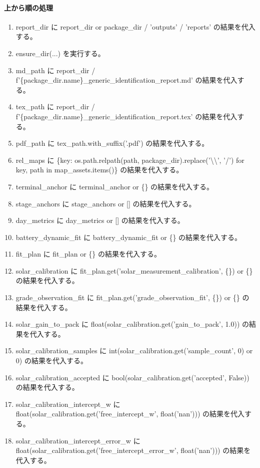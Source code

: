 \documentclass[a4paper,11pt]{article}
\begin{document}
            \paragraph{上から順の処理}
            \begin{enumerate}[leftmargin=1.8em]
            \item report\_dir に report\_dir or package\_dir / 'outputs' / 'reports' の結果を代入する。
\item ensure\_dir(...) を実行する。
\item md\_path に report\_dir / f'\{package\_dir.name\}\_generic\_identification\_report.md' の結果を代入する。
\item tex\_path に report\_dir / f'\{package\_dir.name\}\_generic\_identification\_report.tex' の結果を代入する。
\item pdf\_path に tex\_path.with\_suffix('.pdf') の結果を代入する。
\item rel\_maps に \{key: os.path.relpath(path, package\_dir).replace('\textbackslash{}\textbackslash{}', '/') for key, path in map\_assets.items()\} の結果を代入する。
\item terminal\_anchor に terminal\_anchor or \{\} の結果を代入する。
\item stage\_anchors に stage\_anchors or [] の結果を代入する。
\item day\_metrics に day\_metrics or [] の結果を代入する。
\item battery\_dynamic\_fit に battery\_dynamic\_fit or \{\} の結果を代入する。
\item fit\_plan に fit\_plan or \{\} の結果を代入する。
\item solar\_calibration に fit\_plan.get('solar\_measurement\_calibration', \{\}) or \{\} の結果を代入する。
\item grade\_observation\_fit に fit\_plan.get('grade\_observation\_fit', \{\}) or \{\} の結果を代入する。
\item solar\_gain\_to\_pack に float(solar\_calibration.get('gain\_to\_pack', 1.0)) の結果を代入する。
\item solar\_calibration\_samples に int(solar\_calibration.get('sample\_count', 0) or 0) の結果を代入する。
\item solar\_calibration\_accepted に bool(solar\_calibration.get('accepted', False)) の結果を代入する。
\item solar\_calibration\_intercept\_w に float(solar\_calibration.get('free\_intercept\_w', float('nan'))) の結果を代入する。
\item solar\_calibration\_intercept\_error\_w に float(solar\_calibration.get('free\_intercept\_error\_w', float('nan'))) の結果を代入する。

\end{enumerate}
\end{document}
